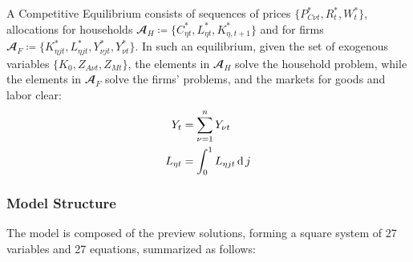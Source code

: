 \documentclass[
	thesis.tex
	]{subfiles}
\begin{document}
A Competitive Equilibrium consists of sequences of prices $\{P_{C\nu t}^\ast, R_t^\ast, W_t^\ast\}$, allocations for households $\mathbfscr{A}_H \coloneq \{C_{\eta t}^\ast, L_{\eta t}^\ast, K_{\eta, t+1}^\ast\}$ and for firms $\mathbfscr{A}_F \coloneq \{K_{\eta jt}^\ast, L_{\eta jt}^\ast, Y_{\nu jt}^\ast, Y_{\nu t}^\ast\}$. In such an equilibrium, given the set of exogenous variables $\{K_0, Z_{A\nu t}, Z_{Mt}\}$, the elements in $\mathbfscr{A}_H$ solve the household problem, while the elements in $\mathbfscr{A}_F$ solve the firms' problems, and the markets for goods and labor clear:
\begin{align}
	Y_t &= \sum_{\nu=1}^{n} Y_{\nu t} \label{eq:reg-market-clearing-condition} \\
	L_{\eta t} &= \int_{0}^{1} L_{\eta jt} \operatorname{d} j \label{eq:reg-market-clearing-condition-2}
\end{align}



\subsubsection*{Model Structure}

The model is composed of the preview solutions, forming a square system of 27 variables and 27 equations, summarized as follows:
\end{document}
